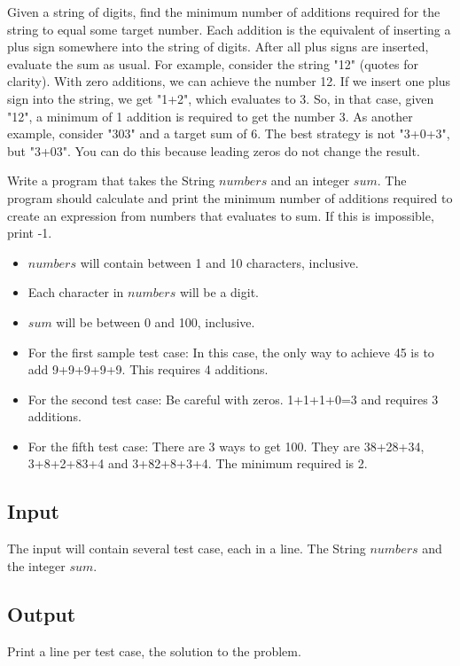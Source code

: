 Given a string of digits, find the minimum number of additions required for the string to equal some target number. Each addition is the equivalent of inserting a plus sign somewhere into the string of digits. After all plus signs are inserted, evaluate the sum as usual. For example, consider the string "12" (quotes for clarity). With zero additions, we can achieve the number 12. If we insert one plus sign into the string, we get "1+2", which evaluates to 3. So, in that case, given "12", a minimum of 1 addition is required to get the number 3. As another example, consider "303" and a target sum of 6. The best strategy is not "3+0+3", but "3+03". You can do this because leading zeros do not change the result.

Write a program that takes the String $numbers$ and an integer $sum$. The program should calculate and print the minimum number of additions required to create an expression from numbers that evaluates to sum. If this is impossible, print -1.

\begin{itemize}
\item $numbers$ will contain between 1 and 10 characters, inclusive.
\item Each character in $numbers$ will be a digit.
\item $sum$ will be between 0 and 100, inclusive.
\item For the first sample test case: In this case, the only way to achieve 45 is to add 9+9+9+9+9. This requires 4 additions.
\item For the second test case: Be careful with zeros. 1+1+1+0=3 and requires 3 additions.
\item For the fifth test case: There are 3 ways to get 100. They are 38+28+34, 3+8+2+83+4 and 3+82+8+3+4. The minimum required is 2.
\end{itemize}

\subsection* {Input}

The input will contain several test case, each in a line. The String $numbers$ and the integer $sum$.

\subsection* {Output}

Print a line per test case, the solution to the problem.


